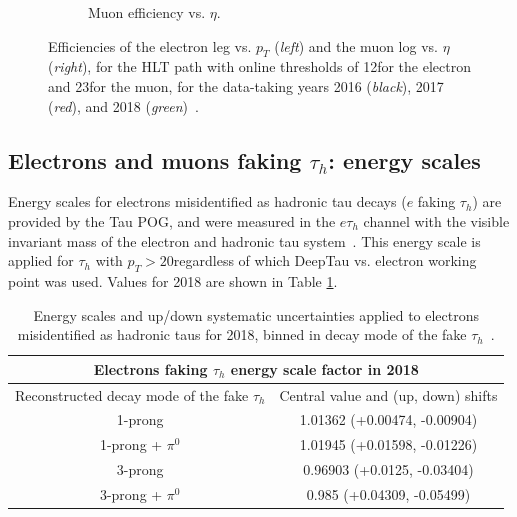 \begin{figure}[ht]
\begin{subfigure}{0.45\textwidth}
        \caption{Muon efficiency vs. $\eta$.}
        \label{fig:muon_efficiency_vs_eta_emu}
    \end{subfigure}
    \caption[Efficiencies of the electron leg vs. $p_{T}$ (\textit{left}) and the muon log vs. $\eta$ (\textit{right}), for the HLT path with online thresholds of 12\GeV for the electron and 23\GeV for the muon, with the data-taking years 2016 through 2018 overlaid.]{Efficiencies of the electron leg vs. $p_{T}$ (\textit{left}) and the muon log vs. $\eta$ (\textit{right}), for the HLT path with online thresholds of 12\GeV for the electron and 23\GeV for the muon, for the data-taking years 2016 (\textit{black}), 2017 (\textit{red}), and 2018 (\textit{green})~\cite{CMS-DP-2019-025}.} 
\end{figure}


\subsection{Electrons and muons faking \texorpdfstring{$\tau_{h}$}{tauh}: energy scales}

Energy scales for electrons misidentified as hadronic tau decays ($e$ faking $\tau_{h}$) are provided by the Tau POG, and were measured in the $e\tau_{h}$ channel with the visible invariant mass of the electron and hadronic tau system~\cite{twiki_HiggsToTauTauWorkingLegacyRun2}. This energy scale is applied for $\tau_{h}$ with $p_{T} > 20$\GeV regardless of which DeepTau vs. electron working point was used. Values for 2018 are shown in Table \ref{table:electron-faking-tauh-FES-2018}.

\begin{table}[ht]
    \centering
    \begin{tabular}{|c|c|}
    \hline
    \multicolumn{2}{|c|}{Electrons faking $\tau_{h}$ energy scale factor in 2018}      \\ \hline
    \hline
    Reconstructed decay mode of the fake $\tau_{h}$  & Central value and (up, down) shifts \\ \hline
    1-prong            & 1.01362 (+0.00474, -0.00904) \\
    1-prong + $\pi^0$  & 1.01945 (+0.01598, -0.01226) \\
    3-prong            & 0.96903 (+0.0125, -0.03404) \\
    3-prong + $\pi^0$  & 0.985 (+0.04309, -0.05499) \\ \hline
    \end{tabular}
    \caption[Energy scales and up/down systematic uncertainties applied to electrons misidentified as hadronic taus.]{Energy scales and up/down systematic uncertainties applied to electrons misidentified as hadronic taus for 2018, binned in decay mode of the fake $\tau_{h}$~\cite{twiki_HiggsToTauTauWorkingLegacyRun2}.}
    \label{table:electron-faking-tauh-FES-2018}
\end{table}

